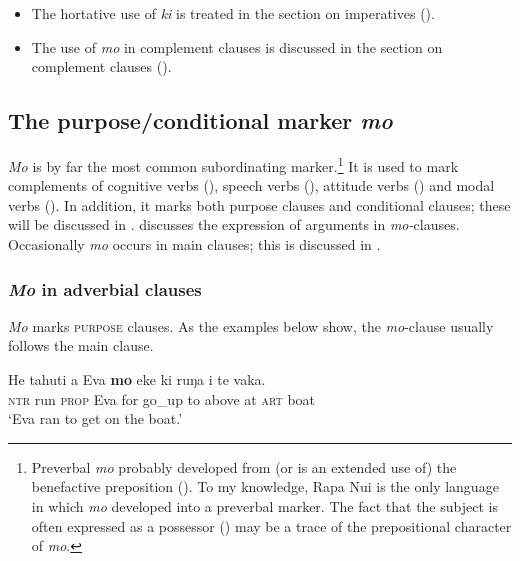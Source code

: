 \begin{itemize}
\item 
The hortative use of \textit{ki} is treated in the section on imperatives ().

\item 
The use of \textit{mo} in complement clauses is discussed in the section on complement clauses ().

\end{itemize}
\subsection{The purpose/conditional marker \textit{mo}}\label{sec:11.5.1}
\textit{Mo} is by far the most common subordinating marker.\footnote{\label{fn:520}Preverbal \textit{mo} probably developed from (or is an extended use of) the benefactive preposition (). To my knowledge, Rapa Nui is the only language in which \textit{mo} developed into a preverbal marker. The fact that the subject is often expressed as a possessor () may be a trace of the prepositional character of \textit{mo}.} It is used to mark complements of cognitive verbs (), speech verbs (), attitude verbs () and modal verbs (). In addition, it marks both purpose clauses and conditional clauses; these will be discussed in .  discusses the expression of arguments in \textit{mo-}clauses. Occasionally \textit{mo} occurs in main clauses; this is discussed in .

\subsubsection{\textit{Mo} in adverbial clauses}\label{sec:11.5.1.1}

\textit{Mo} marks \textsc{purpose} clauses. As the examples below show, the \textit{mo}{}-clause usually follows the main clause. 

\ea\label{ex:11.141}
\gll He tahuti a Eva \textbf{mo} eke ki ruŋa i te vaka. \\
\textsc{ntr} run \textsc{prop} Eva for go\_up to above at \textsc{art} boat \\

\glt 
‘Eva ran to get on the boat.’ \textstyleExampleref{[R210.060]} 
\z

